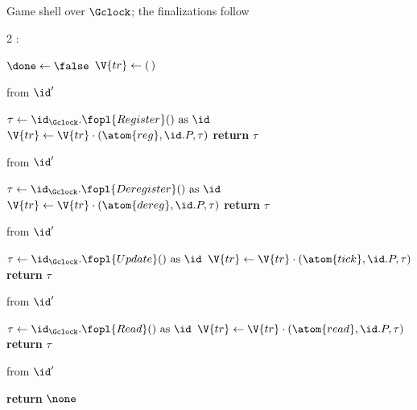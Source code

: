 \documentclass[10pt,oneside,openany]{book}
\theoremstyle{accentdef}
\theoremstyle{accentplain}
\begin{document}
\begin{interface}[nofloat]{Game shell over $\Gclock$; the finalizations follow \\
}

{\scriptsize
\setlength{\columnsep}{1.4em}
\begin{multicols}{2}
:
\begin{algorithmic}[1]
\setcounter{contline}{0}\algcont
\State $\done \gets \false$
\State $\V{tr} \gets (\,)$
\algsave
\end{algorithmic}
\vspace{1.4ex}

 \quad from $\id'$
\begin{algorithmic}[1]
\algcont
\Req{$\neg\done$}
\State $\tau \gets \id_{\Gclock}.\fopl{Register}() \text{ as } \id$ \label{ln:greg}
\State $\V{tr} \gets \V{tr} \cdot (\atom{reg},\id.P,\tau)$
\State \textbf{return} $\tau$
\algsave
\end{algorithmic}
\vspace{1.4ex}

 \quad from $\id'$
\begin{algorithmic}[1]
\algcont
\Req{$\neg\done$}
\State $\tau \gets \id_{\Gclock}.\fopl{Deregister}() \text{ as } \id$
\State $\V{tr} \gets \V{tr} \cdot (\atom{dereg},\id.P,\tau)$
\State \textbf{return} $\tau$
\algsave
\end{algorithmic}
\vspace{1.4ex}

 \quad from $\id'$
\begin{algorithmic}[1]
\algcont
\Req{$\neg\done$}
\State $\tau \gets \id_{\Gclock}.\fopl{Update}() \text{ as } \id$ \label{ln:gtick}
\State $\V{tr} \gets \V{tr} \cdot (\atom{tick},\id.P,\tau)$
\State \textbf{return} $\tau$
\algsave
\end{algorithmic}
\vspace{1.4ex}

\columnbreak

 \quad from $\id'$
\begin{algorithmic}[1]
\algcont
\Req{$\neg\done$}
\State $\tau \gets \id_{\Gclock}.\fopl{Read}() \text{ as } \id$
\State $\V{tr} \gets \V{tr} \cdot (\atom{read},\id.P,\tau)$
\State \textbf{return} $\tau$
\algsave
\end{algorithmic}
\vspace{1.4ex}

 \quad from $\id'$
\begin{algorithmic}[1]
\algcont
\State \textbf{return} $\none$
\algsave
\end{algorithmic}
\vspace{1.4ex}

\end{multicols}}
\end{interface}
\end{document}
